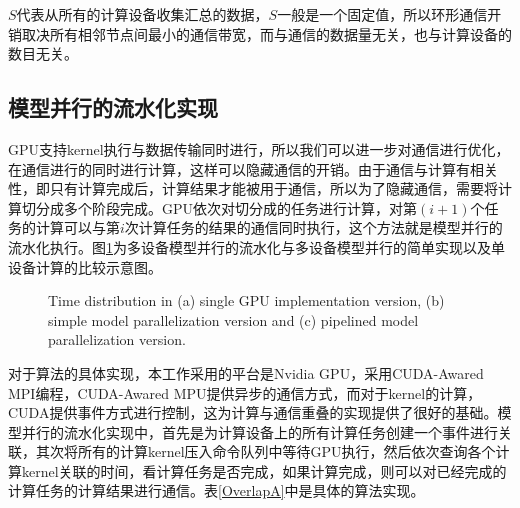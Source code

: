 $S$代表从所有的计算设备收集汇总的数据，$S$一般是一个固定值，所以环形通信开销取决所有相邻节点间最小的通信带宽，而与通信的数据量无关，也与计算设备的数目无关。

\subsection{模型并行的流水化实现}
GPU支持kernel执行与数据传输同时进行，所以我们可以进一步对通信进行优化，在通信进行的同时进行计算，这样可以隐藏通信的开销。由于通信与计算有相关性，即只有计算完成后，计算结果才能被用于通信，所以为了隐藏通信，需要将计算切分成多个阶段完成。GPU依次对切分成的任务进行计算，对第$(i+1)$个任务的计算可以与第$i$次计算任务的结果的通信同时执行，这个方法就是模型并行的流水化执行。图\ref{pipelinedModelParallel}为多设备模型并行的流水化与多设备模型并行的简单实现以及单设备计算的比较示意图。

\begin{figure}[tbh]%
\centering
{}
\caption{Time distribution in (a) single GPU implementation version, (b) simple model parallelization version and (c) pipelined model parallelization version.}
\label{pipelinedModelParallel}
\end{figure}

对于算法的具体实现，本工作采用的平台是Nvidia GPU，采用CUDA-Awared MPI编程，CUDA-Awared MPU提供异步的通信方式，而对于kernel的计算，CUDA提供事件方式进行控制，这为计算与通信重叠的实现提供了很好的基础。模型并行的流水化实现中，首先是为计算设备上的所有计算任务创建一个事件进行关联，其次将所有的计算kernel压入命令队列中等待GPU执行，然后依次查询各个计算kernel关联的时间，看计算任务是否完成，如果计算完成，则可以对已经完成的计算任务的计算结果进行通信。表\ref{OverlapA}中是具体的算法实现。

